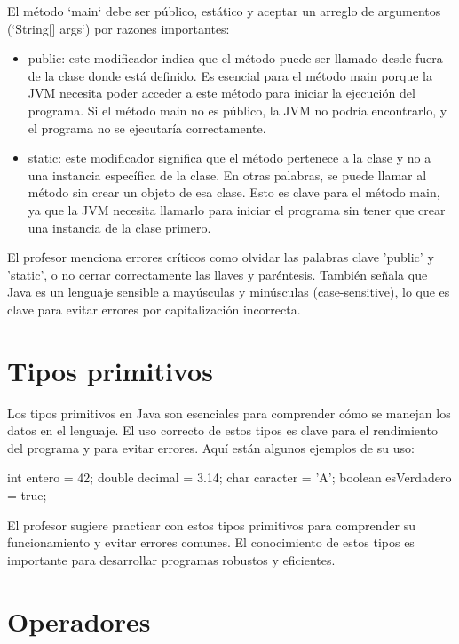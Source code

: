 \documentclass[a4paper]{report}
\begin{document}
El método `main` debe ser público, estático y aceptar un arreglo de argumentos (`String[] args`) por razones importantes:

\begin{itemize}

    \item public: este modificador indica que el método puede ser llamado desde fuera de la clase donde está definido. Es esencial para el método main porque la JVM necesita poder acceder a este método para iniciar la ejecución del programa. Si el método main no es público, la JVM no podría encontrarlo, y el programa no se ejecutaría correctamente.

    \item static: este modificador significa que el método pertenece a la clase y no a una instancia específica de la clase. En otras palabras, se puede llamar al método sin crear un objeto de esa clase. Esto es clave para el método main, ya que la JVM necesita llamarlo para iniciar el programa sin tener que crear una instancia de la clase primero.

\end{itemize}

El profesor menciona errores críticos como olvidar las palabras clave 'public' y 'static', o no cerrar correctamente las llaves y paréntesis. También señala que Java es un lenguaje sensible a mayúsculas y minúsculas (case-sensitive), lo que es clave para evitar errores por capitalización incorrecta.

\section{Tipos primitivos}

Los tipos primitivos en Java son esenciales para comprender cómo se manejan los datos en el lenguaje. El uso correcto de estos tipos es clave para el rendimiento del programa y para evitar errores. Aquí están algunos ejemplos de su uso:

\begin{roundedlst}
int entero = 42;
double decimal = 3.14;
char caracter = 'A';
boolean esVerdadero = true;
\end{roundedlst}


El profesor sugiere practicar con estos tipos primitivos para comprender su funcionamiento y evitar errores comunes. El conocimiento de estos tipos es importante para desarrollar programas robustos y eficientes.

\section{Operadores}
\end{document}
